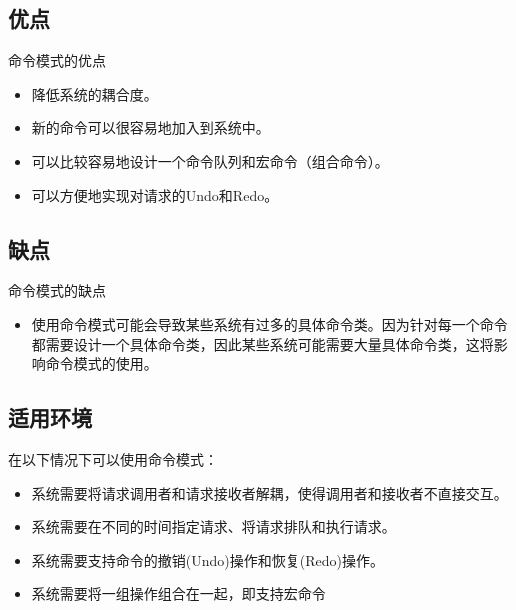 \documentclass[letterpaper,10pt,english]{sphinxmanual}
\begin{document}
\subsection{优点}
\label{\detokenize{behavioral_patterns/command:id10}}
\sphinxAtStartPar
命令模式的优点
\begin{itemize}
\item {} 
\sphinxAtStartPar
降低系统的耦合度。

\item {} 
\sphinxAtStartPar
新的命令可以很容易地加入到系统中。

\item {} 
\sphinxAtStartPar
可以比较容易地设计一个命令队列和宏命令（组合命令）。

\item {} 
\sphinxAtStartPar
可以方便地实现对请求的Undo和Redo。

\end{itemize}


\subsection{缺点}
\label{\detokenize{behavioral_patterns/command:id11}}
\sphinxAtStartPar
命令模式的缺点
\begin{itemize}
\item {} 
\sphinxAtStartPar
使用命令模式可能会导致某些系统有过多的具体命令类。因为针对每一个命令都需要设计一个具体命令类，因此某些系统可能需要大量具体命令类，这将影响命令模式的使用。

\end{itemize}


\subsection{适用环境}
\label{\detokenize{behavioral_patterns/command:id12}}
\sphinxAtStartPar
在以下情况下可以使用命令模式：
\begin{itemize}
\item {} 
\sphinxAtStartPar
系统需要将请求调用者和请求接收者解耦，使得调用者和接收者不直接交互。

\item {} 
\sphinxAtStartPar
系统需要在不同的时间指定请求、将请求排队和执行请求。

\item {} 
\sphinxAtStartPar
系统需要支持命令的撤销(Undo)操作和恢复(Redo)操作。

\item {} 
\sphinxAtStartPar
系统需要将一组操作组合在一起，即支持宏命令

\end{itemize}
\end{document}
